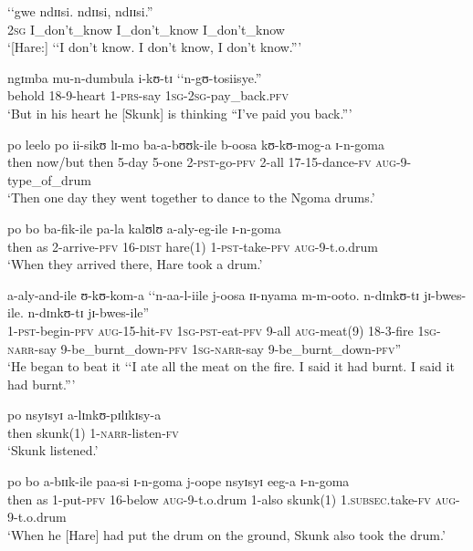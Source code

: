 \begin{exe}
\ex \gll \lq\lq gwe ndɪɪsi. ndɪɪsi, ndɪɪsi.''\\
\phantom{\lq\lq}\textsc{2sg} I\_don't\_know I\_don't\_know I\_don't\_know\\
\glt \lq [Hare:] \lq\lq I don't know. I don't know, I don't know.''{}'

\ex \gll ngɪmba mu-n-dumbula i-kʊ-tɪ \lq\lq n-gʊ-tosiisye.''\\
behold 18-9-heart 1-\textsc{prs}-say \phantom{\lq\lq}\textsc{1sg}-\textsc{2sg}-pay\_back.\textsc{pfv}\\
\glt `But in his heart he [Skunk] is thinking ``I've paid you back.''{}'

\ex \gll po leelo po ii-sikʊ lɪ-mo ba-a-bʊʊk-ile b-oosa kʊ-kʊ-mog-a ɪ-n-goma\\
then now/but then 5-day 5-one 2-\textsc{pst}-go-\textsc{pfv} 2-all 17-15-dance-\textsc{fv} \textsc{aug}-9-type\_of\_drum\\
\glt \lq Then one day they went together to dance to the Ngoma drums.'

\ex \gll po bo ba-fik-ile pa-la kalʊlʊ a-aly-eg-ile ɪ-n-goma\\
then as 2-arrive-\textsc{pfv} 16-\textsc{dist} hare(1) 1-\textsc{pst}-take-\textsc{pfv} \textsc{aug}-9-t.o.drum\\
\glt \lq When they arrived there, Hare took a drum.'

\ex \gll a-aly-and-ile ʊ-kʊ-kom-a \lq\lq n-aa-l-iile j-oosa ɪɪ-nyama m-m-ooto. n-dɪnkʊ-tɪ jɪ-bwes-ile. n-dɪnkʊ-tɪ jɪ-bwes-ile''\\
1-\textsc{pst}-begin-\textsc{pfv} \textsc{aug}-15-hit-\textsc{fv} \phantom{\lq\lq}\textsc{1sg}-\textsc{pst}-eat-\textsc{pfv} 9-all \textsc{aug}-meat(9) 18-3-fire \textsc{1sg}-\textsc{narr}-say 9-be\_burnt\_down-\textsc{pfv} \textsc{1sg}-\textsc{narr}-say  9-be\_burnt\_down-\textsc{pfv}''\\
\glt \lq He began to beat it \lq\lq I ate all the meat on the fire. I said it had burnt. I said it had burnt.''{}'

\ex \gll po nsyɪsyɪ a-lɪnkʊ-pɪlɪkɪsy-a\\
then skunk(1) 1-\textsc{narr}-listen-\textsc{fv}\\
\glt \lq Skunk listened.'

\ex \gll po bo a-bɪɪk-ile paa-si ɪ-n-goma j-oope nsyɪsyɪ eeg-a ɪ-n-goma\\
then as 1-put-\textsc{pfv} 16-below \textsc{aug}-9-t.o.drum 1-also skunk(1) 1.\textsc{subsec}.take-\textsc{fv} \textsc{aug}-9-t.o.drum\\
\glt \lq When he [Hare] had put the drum on the ground, Skunk also took the drum.'


\end{exe}
